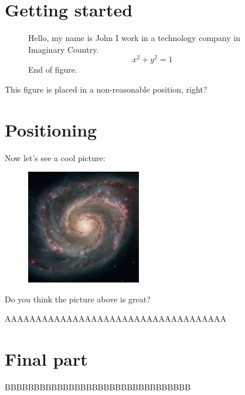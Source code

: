 \documentclass[12pt]{article}
\begin{document}
\section{Getting started}

\begin{figure}
    Hello, my name is John
    I work in a technology company in Imaginary Country.
    \[ x^2 + y^2 = 1 \]
    End of figure.
\end{figure}

This figure is placed in a non-reasonable position, right?


\newpage
\section{Positioning}

\blindtext

Now let's see a cool picture:

\begin{figure}[h]
    \includegraphics[width=5cm]{img/universe.jpg}
\end{figure}

Do you think the picture above is great?

\Blindtext[2]

AAAAAAAAAAAAAAAAAAAAAAAAAAAAAAAAAAAA

\blindtext

\section{Final part}

BBBBBBBBBBBBBBBBBBBBBBBBBBBBBBBB
\end{document}
